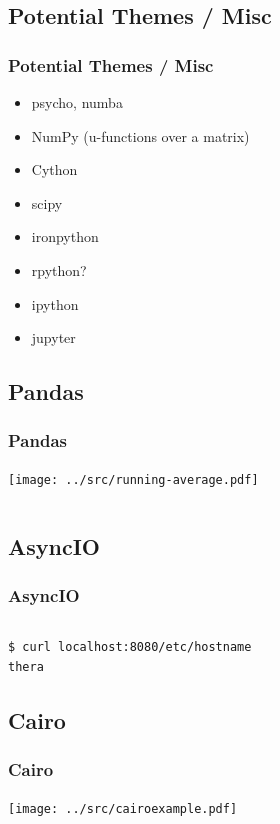 \subsection{Potential Themes / Misc}
\begin{frame}
    \frametitle{Potential Themes / Misc}
    \vspace{5mm}
    
    \begin{itemize}
      \item psycho, numba
      \item NumPy (u-functions over a matrix)
      \item Cython
      \item scipy
      \item ironpython
      \item rpython?
      \item ipython
      \item jupyter
    \end{itemize}
\end{frame}

\subsection{Pandas}
\begin{frame}
    \frametitle{Pandas}
    \vspace{3mm}
    \hspace{105mm}\texttt{[image: ../src/running-average.pdf]}
    \vspace{-73mm}\inputminted[fontsize=\footnotesize]{python}{../src/pandas-example.py}
\end{frame}

\subsection{AsyncIO}
\begin{frame}[fragile]
    \frametitle{AsyncIO}
    \vspace{-2mm}
    \inputminted[fontsize=\tiny]{python3}{../src/webserver.py}
    \pause
    \vspace{2mm}
    {\tiny
    \begin{verbatim}
$ curl localhost:8080/etc/hostname
thera
    \end{verbatim}
    }
\end{frame}

\subsection{Cairo}
\begin{frame}
    \frametitle{Cairo}
    \vspace{10mm}
    \hspace{105mm}\texttt{[image: ../src/cairoexample.pdf]}
    \vspace{-75mm}\inputminted[fontsize=\footnotesize]{python}{../src/cairoexample.py}
\end{frame}

